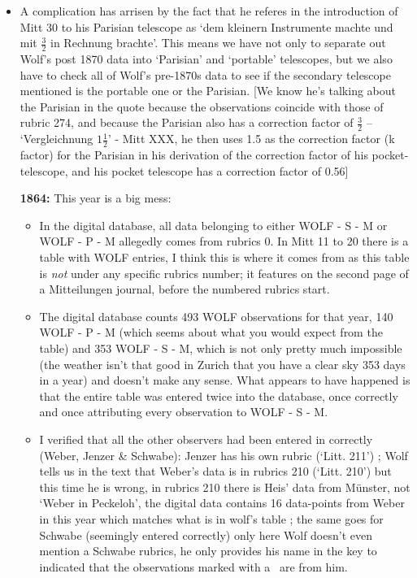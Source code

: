 \documentclass[12pt]{article}
\begin{document}
\begin{itemize}
    \item A complication has arrisen by the fact that he referes in the introduction of Mitt 30 to his Parisian telescope as `dem kleinern Instrumente machte und mit $\frac{3}{2}$ in Rechnung brachte'. This means we have not only to separate out Wolf's post 1870 data into `Parisian' and `portable' telescopes, but we also have to check all of Wolf's pre-1870s data to see if the secondary telescope mentioned is the portable one or the Parisian. [We know he's talking about the Parisian in the quote because the observations coincide with those of rubric 274, and because the Parisian also has a correction factor of $\frac{3}{2}$ -- `Vergleichnung $1\frac{1}{2}$' - Mitt XXX, he then uses 1.5 as the correction factor (k factor) for the Parisian in his derivation of the correction factor of his pocket-telescope, and his pocket telescope has a correction factor of 0.56]
    \item[\textbf{1864:}] This year is a big mess:
    \begin{itemize}[$\longrightarrow$]
        \item In the digital database, all data belonging to either WOLF - S - M or WOLF - P - M allegedly comes from rubrics 0. In Mitt 11 to 20 there is a table with WOLF entries, I think this is where it comes from as this table is \textit{not} under any specific rubrics number; it features on the second page of a Mitteilungen journal, before the numbered rubrics start.
        \item The digital database counts 493 WOLF observations for that year, 140 WOLF - P - M (which seems about what you would expect from the table) and 353 WOLF - S - M, which is not only pretty much impossible (the weather isn't that good in Zurich that you have a clear sky 353 days in a year) and doesn't make any sense. What appears to have happened is that the entire table was entered twice into the database, once correctly and once attributing every observation to WOLF - S - M. 
        \item I verified that all the other observers had been entered in correctly (Weber, Jenzer & Schwabe): Jenzer has his own rubric (`Litt. 211') ; Wolf tells us in the text that Weber's data is in rubrics 210 (`Litt. 210') but this time he is wrong, in rubrics 210 there is Heis' data from Münster, not `Weber in Peckeloh', the digital data contains 16 data-points from Weber in this year which matches what is in wolf's table ; the same goes for Schwabe (seemingly entered correctly) only here Wolf doesn't even mention a Schwabe rubrics, he only provides his name in the key to indicated that the observations marked with a \dag\ are from him.

\end{itemize}
\end{itemize}
\end{document}
